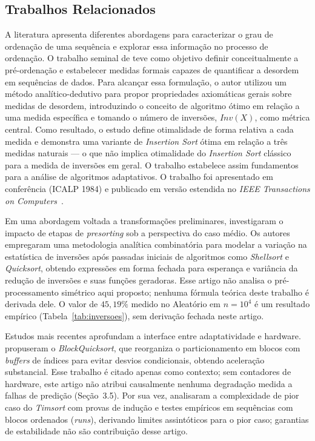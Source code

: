 \documentclass[portuguese]{sbc2025}%
\begin{document}
\subsection{Trabalhos Relacionados}

A literatura apresenta diferentes abordagens para caracterizar o grau de ordenação de uma sequência e explorar essa informação no processo de ordenação. O trabalho seminal de \citet{mannila_measures_1984} teve como objetivo definir conceitualmente a pré-ordenação e estabelecer medidas formais capazes de quantificar a desordem em sequências de dados. Para alcançar essa formulação, o autor utilizou um método analítico-dedutivo para propor propriedades axiomáticas gerais sobre medidas de desordem, introduzindo o conceito de algoritmo ótimo em relação a uma medida específica e tomando o número de inversões, $Inv(X)$, como métrica central. Como resultado, o estudo define otimalidade de forma relativa a cada medida e demonstra uma variante de \emph{Insertion Sort} ótima em relação a três medidas naturais — o que não implica otimalidade do \emph{Insertion Sort} clássico para a medida de inversões em geral. O trabalho estabelece assim fundamentos para a análise de algoritmos adaptativos. O trabalho foi apresentado em conferência (ICALP 1984) e publicado em versão estendida no \emph{IEEE Transactions on Computers}~\citep{mannila_measures_1984}.

Em uma abordagem voltada a transformações preliminares, \citet{hwang_presorting_2000} investigaram o impacto de etapas de \emph{presorting} sob a perspectiva do caso médio. Os autores empregaram uma metodologia analítica combinatória para modelar a variação na estatística de inversões após passadas iniciais de algoritmos como \emph{Shellsort} e \emph{Quicksort}, obtendo expressões em forma fechada para esperança e variância da redução de inversões e suas funções geradoras. Esse artigo não analisa o pré-processamento simétrico aqui proposto; nenhuma fórmula teórica deste trabalho é derivada dele. O valor de $45{,}19\%$ medido no Aleatório em $n{=}10^4$ é um resultado empírico (Tabela~\ref{tab:inversoes}), sem derivação fechada neste artigo.

Estudos mais recentes aprofundam a interface entre adaptatividade e hardware. \citet{edelkamp_blockquicksort_2016} propuseram o \emph{BlockQuicksort}, que reorganiza o particionamento em blocos com \emph{buffers} de índices para evitar desvios condicionais, obtendo aceleração substancial. Esse trabalho é citado apenas como contexto; sem contadores de hardware, este artigo não atribui causalmente nenhuma degradação medida a falhas de predição (Seção~3.5). Por sua vez, \citet{auger_timsort_2018} analisaram a complexidade de pior caso do \emph{Timsort} com provas de indução e testes empíricos em sequências com blocos ordenados (\emph{runs}), derivando limites assintóticos para o pior caso; garantias de estabilidade não são contribuição desse artigo.
\end{document}
